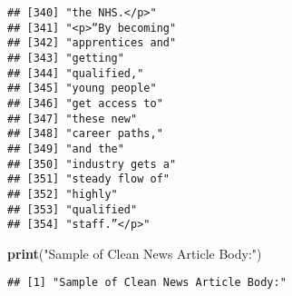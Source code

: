 \documentclass[]{article}
\newenvironment{Shaded}{\begin{snugshade}}{\end{snugshade}}
\newcommand{\KeywordTok}[1]{\textcolor[rgb]{0.13,0.29,0.53}{\textbf{#1}}}
\newcommand{\StringTok}[1]{\textcolor[rgb]{0.31,0.60,0.02}{#1}}
\newcommand{\NormalTok}[1]{#1}
\begin{document}
\begin{verbatim}
## [340] "the NHS.</p>"                                                                                                                             
## [341] "<p>“By becoming"                                                                                                                          
## [342] "apprentices and"                                                                                                                          
## [343] "getting"                                                                                                                                  
## [344] "qualified,"                                                                                                                               
## [345] "young people"                                                                                                                             
## [346] "get access to"                                                                                                                            
## [347] "these new"                                                                                                                                
## [348] "career paths,"                                                                                                                            
## [349] "and the"                                                                                                                                  
## [350] "industry gets a"                                                                                                                          
## [351] "steady flow of"                                                                                                                           
## [352] "highly"                                                                                                                                   
## [353] "qualified"                                                                                                                                
## [354] "staff.”</p>"
\end{verbatim}

\begin{Shaded}
\begin{Highlighting}[]
\KeywordTok{print}\NormalTok{(}\StringTok{"Sample of Clean News Article Body:"}\NormalTok{)}
\end{Highlighting}
\end{Shaded}

\begin{verbatim}
## [1] "Sample of Clean News Article Body:"
\end{verbatim}
\end{document}
